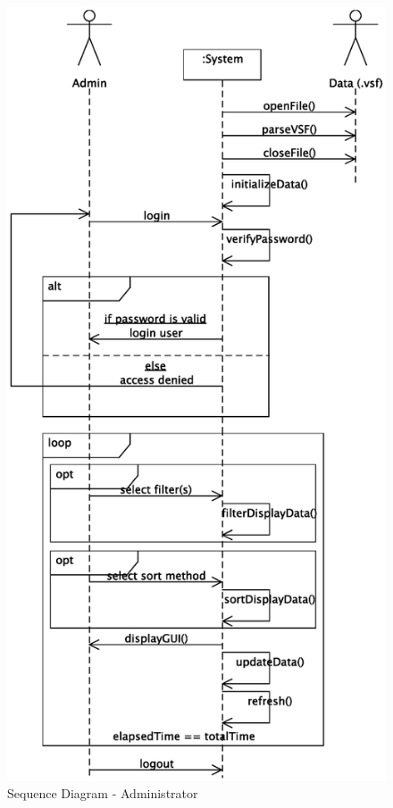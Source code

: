 \documentclass{article}
\begin{document}
\begin{figure}[!htb]
\caption{Sequence Diagram - Administrator}
\centering
\includegraphics[scale=0.6]{diagrams/admin-sequence-diagram.eps}
\end{figure}
\end{document}
